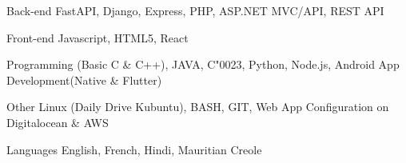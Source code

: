 

\begin{cvskills}

  \cvskill
    {Back-end} %
    {FastAPI, Django, Express, PHP, ASP.NET MVC/API, REST API} %

  \cvskill
    {Front-end} %
    {Javascript, HTML5, React} %

  \cvskill
    {Programming} %
    {(Basic C \& C++), JAVA, C\char"0023, Python, Node.js, Android App Development(Native \& Flutter)} %

  \cvskill
    {Other} %
    {Linux (Daily Drive Kubuntu), BASH, GIT, Web App Configuration on Digitalocean \& AWS} %

  \cvskill
    {Languages} %
    {English, French, Hindi, Mauritian Creole} %



\end{cvskills}
